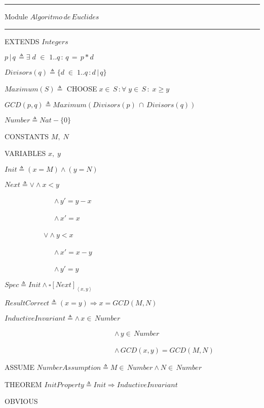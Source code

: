 \noindent \rule[0.5ex]{0.28\columnwidth}{1pt} Module $Algoritmo\, de\, Euclides$
\rule[0.5ex]{0.28\columnwidth}{1pt}

\noindent EXTENDS $Integers$

\noindent $p\,|\, q\,\triangleq\exists\; d\,\,\in\,\,1..q\,:\, q\,=\, p*d$

\noindent $Divisors(q)\triangleq\{d\;\in\;1..q\,:d\,|\, q\}$

\noindent $Maximum(S)\triangleq$ CHOOSE$\; x\in\, S\,:\forall\; y\in\, S\,:\; x\geq y$

\noindent $GCD(p,q)\triangleq Maximum(Divisors(p)\,\cap\, Divisors(q))$

\noindent $Number\triangleq Nat-\{0\}$

\noindent CONSTANTS $M,\; N$

\noindent VARIABLES $x,\; y$

\noindent $Init\triangleq(x=M)\wedge(y=N)$

\noindent $Next\triangleq\vee\wedge x<y$

\noindent ~~~~~~~~~~~~~~$\wedge\, y'=y-x$

\noindent ~~~~~~~~~~~~~~$\wedge\, x'=x$

\noindent ~~~~~~~~~~~$\vee\wedge y<x$

\noindent ~~~~~~~~~~~~~~$\wedge\, x'=x-y$

\noindent ~~~~~~~~~~~~~~$\wedge\, y'=y$

\noindent $Spec\triangleq Init\wedge\square[Next]_{\left\langle x,y\right\rangle }$

\noindent $ResultCorrect\triangleq(x=y)\Rightarrow x=GCD(M,N)$

\noindent $InductiveInvariant\triangleq\wedge\, x\in\, Number$

\noindent ~~~~~~~~~~~~~~~~~~~~~~~~~~~~~~~$\wedge\, y\in\, Number$

\noindent ~~~~~~~~~~~~~~~~~~~~~~~~~~~~~~~$\wedge\, GCD(x,y)=GCD(M,N)$

\noindent ASSUME $NumberAssumption\triangleq M\in\, Number\wedge N\in\, Number$

\noindent THEOREM $InitProperty\triangleq Init\Rightarrow InductiveInvariant$

\noindent OBVIOUS